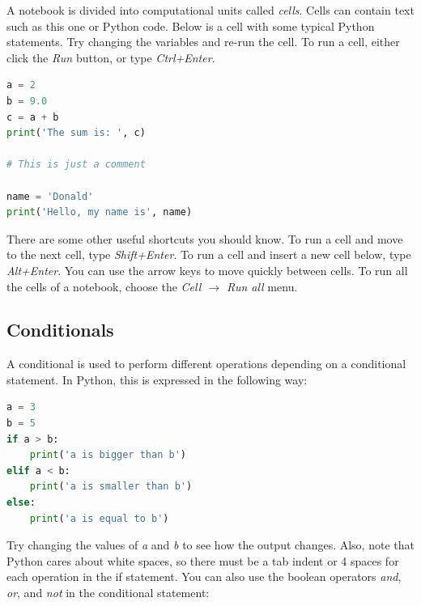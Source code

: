 \documentclass[a4paper , 12pt]{book}
\begin{document}
A notebook is divided into computational units called \textit{cells}. Cells can contain text such as this one or Python code. Below is a cell with some typical Python statements. Try changing the variables and re-run the cell. To run a cell, either click the \textit{Run} button, or type \textit{Ctrl+Enter}.

\begin{center}
\begin{lstlisting}[language=Python, frame=single]
a = 2 
b = 9.0 
c = a + b 
print('The sum is: ', c) 
 	
# This is just a comment 
	
name = 'Donald' 
print('Hello, my name is', name)
\end{lstlisting}
\end{center}

There are some other useful shortcuts you should know. To run a cell and move to the next cell, type \textit{Shift+Enter}. To run a cell and insert a new cell below, type \textit{Alt+Enter}. You can use the arrow keys to move quickly between cells. To run all the cells of a notebook, choose the \textit{Cell $\rightarrow$ Run all} menu.

\subsection{Conditionals}

A conditional is used to perform different operations depending on a conditional statement. In Python, this is expressed in the following way:

\begin{center}
\begin{lstlisting}[language=Python, frame=single]
a = 3
b = 5
if a > b:
    print('a is bigger than b')
elif a < b:    
    print('a is smaller than b')
else:
    print('a is equal to b')
\end{lstlisting}
\end{center}

Try changing the values of \textit{a} and \textit{b} to see how the output changes. Also, note that Python cares about white spaces, so there must be a tab indent or 4 spaces for each operation in the if statement. You can also use the boolean operators \textit{and}, \textit{or}, and \textit{not} in the conditional statement:
\end{document}
